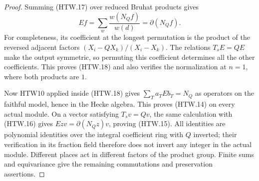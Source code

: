 \begin{proof}
Summing (HTW.17) over reduced Bruhat products gives
\[
 Ef=\sum_w\frac{w(N_Qf)}{w(d)}
                    =\partial(N_Qf).
 \tag{HTW.18}
\]
For completeness, its coefficient at the longest
permutation is the product of the reversed adjacent
factors \((X_i-QX_k)/(X_i-X_k)\).  The relations
\(T_sE=QE\) make the output symmetric, so permuting
this coefficient determines all the other coefficients.
This proves (HTW.18) and also verifies the normalization
at \(n=1\), where both products are \(1\).

Now HTW10 applied inside (HTW.18) gives
\(\sum_Ta_TEb_T=N_Q\) as operators on the faithful
model, hence in the Hecke algebra.  This proves
(HTW.14) on every actual module.  On a vector satisfying
\(T_sv=Qv\), the same calculation with (HTW.16)
gives \(Ezv=\partial(N_Qz)v\), proving (HTW.15).
All identities are polynomial identities over the
integral coefficient ring with \(Q\) inverted;
their verification in its fraction field therefore
does not invert any integer in the actual module.
Different places act in different factors of the
product group.  Finite sums and equivariance give the
remaining commutations and preservation assertions.
\end{proof}

